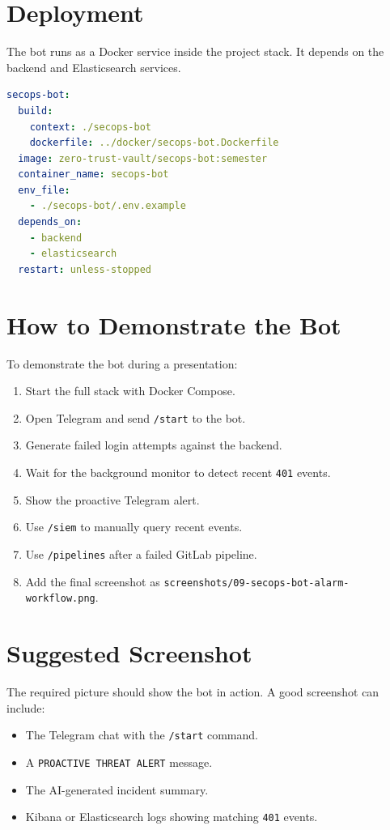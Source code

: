 \documentclass[12pt,a4paper]{report}
\begin{document}
\section{Deployment}

The bot runs as a Docker service inside the project stack. It depends on the backend and Elasticsearch services.

\begin{lstlisting}[language=yaml,caption={Docker Compose bot service}]
secops-bot:
  build:
    context: ./secops-bot
    dockerfile: ../docker/secops-bot.Dockerfile
  image: zero-trust-vault/secops-bot:semester
  container_name: secops-bot
  env_file:
    - ./secops-bot/.env.example
  depends_on:
    - backend
    - elasticsearch
  restart: unless-stopped
\end{lstlisting}

\section{How to Demonstrate the Bot}

To demonstrate the bot during a presentation:

\begin{enumerate}[leftmargin=*]
    \item Start the full stack with Docker Compose.
    \item Open Telegram and send \texttt{/start} to the bot.
    \item Generate failed login attempts against the backend.
    \item Wait for the background monitor to detect recent \texttt{401} events.
    \item Show the proactive Telegram alert.
    \item Use \texttt{/siem} to manually query recent events.
    \item Use \texttt{/pipelines} after a failed GitLab pipeline.
    \item Add the final screenshot as \texttt{screenshots/09-secops-bot-alarm-workflow.png}.
\end{enumerate}

\section{Suggested Screenshot}

The required picture should show the bot in action. A good screenshot can include:

\begin{itemize}[leftmargin=*]
    \item The Telegram chat with the \texttt{/start} command.
    \item A \texttt{PROACTIVE THREAT ALERT} message.
    \item The AI-generated incident summary.
    \item Kibana or Elasticsearch logs showing matching \texttt{401} events.
\end{itemize}
\end{document}
